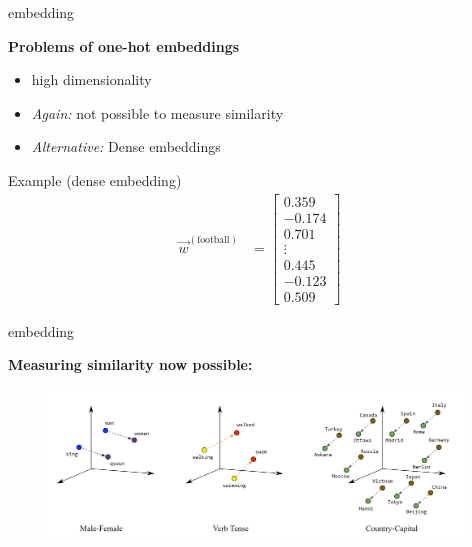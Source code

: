 \begin{vbframe}{embedding}

\vfill

\textbf{Problems of one-hot embeddings}

\begin{itemize}
	\item high dimensionality
	\item \textit{Again:} not possible to measure similarity
	\item \textit{Alternative:} Dense embeddings
\end{itemize}

\begin{exampleblock}{Example (dense embedding)}
	\begin{align*}
				\vec w^{({\text{football}})} &= \begin{bmatrix}
            0.359 \\
           -0.174 \\
            0.701 \\
           \vdots \\
            0.445 \\
           -0.123 \\
            0.509 
         \end{bmatrix}
	\end{align*}
\end{exampleblock}

\vfill

\end{vbframe}


\begin{frame}{embedding}
	
\vfill

\textbf{Measuring similarity now possible:}

\begin{figure}
	\centering
		\includegraphics[width = 11cm]{figure/linear-relationships.png}\\ 
\end{figure}

\vfill
	
\end{frame}

